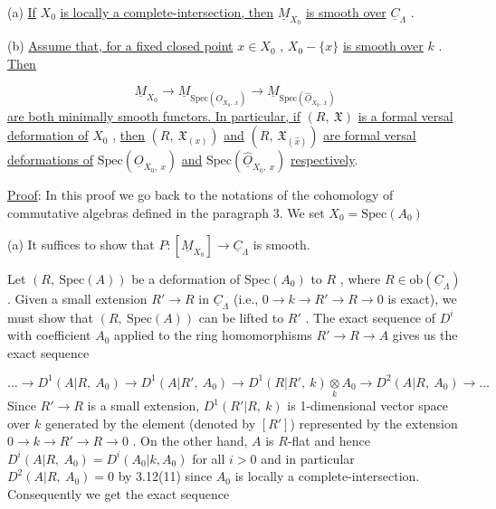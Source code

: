 (a)  \underline{If}  $X_0$  \underline{is locally a complete-intersection, then}  $\underline{M}_{X_0}$  \underline{is smooth over}  $\underline{C}_{\Lambda}$  .

(b)  \underline{Assume that, for a fixed closed point}  $x \in X_0$  ,  $X_0 - \{x\}$  \underline{is smooth over}  $k$  . \underline{Then}

\begin{equation*}
\underline{M}_{X_0} \to \underline{M}_{\mathrm{Spec}(\underline{O}_{X_0,\ x})} \to \underline{M}_{\mathrm{Spec}(\widehat{\underline{O}}_{X_0,\ x})}
\end{equation*}
\underline{are both minimally smooth functors. In particular, if}  $(R,\ \mathfrak{X})$  \underline{is a formal versal deformation of}  $X_0$  , \underline{then}  $(R,\ \mathfrak{X}_{(x)})$  \underline{and}  $(R,\ \mathfrak{X}_{(\hat{x})})$  \underline{are formal versal deformations of}  $\mathrm{Spec}(\underline{O}_{X_0,\ x})$  \underline{and}  $\mathrm{Spec}(\widehat{\underline{O}}_{X_0,\ x})$  \underline{respectively}.

\underline{Proof}:  In this proof we go back to the notations of the cohomology of commutative algebras defined in the paragraph 3. We set  $X_0 = \mathrm{Spec}(A_0)$



(a)  It suffices to show that  $P : [\underline{M}_{X_0}] \to \underline{C}_{\Lambda}$  is smooth.

Let  $(R,\ \mathrm{Spec}(A))$  be a deformation of  $\mathrm{Spec}(A_0)$  to  $R$  , where  $R \in \mathrm{ob}(\underline{C}_{\Lambda})$  . Given a small extension  $R' \to R$  in  $\underline{C}_{\Lambda}$  (i.e.,  $0 \to k \to R' \to R \to 0$  is exact), we must show that  $(R,\ \mathrm{Spec}(A))$  can be lifted to  $R'$  . The exact sequence of  $D^i$  with coefficient  $A_0$  applied to the ring homomorphisms  $R' \to R \to A$  gives us the exact sequence

\begin{equation*}
\ldots \to D^1(A|R,\ A_0) \to D^1(A|R',\ A_0) \to D^1(R|R',\ k) \underset{k}{\otimes} A_0 \to D^2(A|R,\ A_0) \to \ldots
\end{equation*}
Since  $R' \to R$  is a small extension, $D^1(R'|R,\ k)$  is 1-dimensional vector space over  $k$  generated by the element (denoted by  $[R']$) represented by the extension $0 \to k \to R' \to R \to 0$  . On the other hand,  $A$  is $R$-flat and hence $D^i(A|R,\ A_0) = D^i(A_0|k,A_0)$  for all  $i > 0$  and in particular  $D^2(A|R,\ A_0) = 0$ by 3.12(11) since  $A_0$  is locally a complete-intersection. Consequently we get the exact sequence

